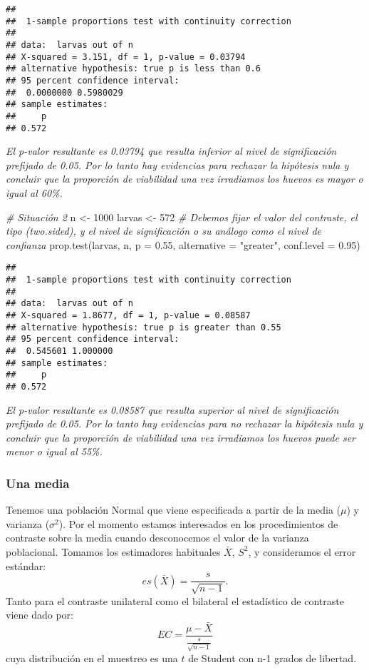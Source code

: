 \documentclass[
]{book}
\newenvironment{Shaded}{\begin{snugshade}}{\end{snugshade}}
\newcommand{\AttributeTok}[1]{\textcolor[rgb]{0.77,0.63,0.00}{#1}}
\newcommand{\CommentTok}[1]{\textcolor[rgb]{0.56,0.35,0.01}{\textit{#1}}}
\newcommand{\DecValTok}[1]{\textcolor[rgb]{0.00,0.00,0.81}{#1}}
\newcommand{\FloatTok}[1]{\textcolor[rgb]{0.00,0.00,0.81}{#1}}
\newcommand{\FunctionTok}[1]{\textcolor[rgb]{0.00,0.00,0.00}{#1}}
\newcommand{\NormalTok}[1]{#1}
\newcommand{\OtherTok}[1]{\textcolor[rgb]{0.56,0.35,0.01}{#1}}
\newcommand{\StringTok}[1]{\textcolor[rgb]{0.31,0.60,0.02}{#1}}
\begin{document}
\begin{verbatim}
## 
##  1-sample proportions test with continuity correction
## 
## data:  larvas out of n
## X-squared = 3.151, df = 1, p-value = 0.03794
## alternative hypothesis: true p is less than 0.6
## 95 percent confidence interval:
##  0.0000000 0.5980029
## sample estimates:
##     p 
## 0.572
\end{verbatim}

\emph{El p-valor resultante es 0.03794 que resulta inferior al nivel de significación prefijado de 0.05. Por lo tanto hay evidencias para rechazar la hipótesis nula y concluir que la proporción de viabilidad una vez irradiamos los huevos es mayor o igual al 60\%.}

\begin{Shaded}
\begin{Highlighting}[]
\CommentTok{\# Situación 2}
\NormalTok{n }\OtherTok{\textless{}{-}} \DecValTok{1000}
\NormalTok{larvas }\OtherTok{\textless{}{-}} \DecValTok{572}
\CommentTok{\# Debemos fijar el valor del contraste, el tipo (two.sided), y el nivel de significación o su análogo como el nivel de confianza}
\FunctionTok{prop.test}\NormalTok{(larvas, n, }\AttributeTok{p =} \FloatTok{0.55}\NormalTok{, }\AttributeTok{alternative =} \StringTok{"greater"}\NormalTok{, }\AttributeTok{conf.level =} \FloatTok{0.95}\NormalTok{)}
\end{Highlighting}
\end{Shaded}

\begin{verbatim}
## 
##  1-sample proportions test with continuity correction
## 
## data:  larvas out of n
## X-squared = 1.8677, df = 1, p-value = 0.08587
## alternative hypothesis: true p is greater than 0.55
## 95 percent confidence interval:
##  0.545601 1.000000
## sample estimates:
##     p 
## 0.572
\end{verbatim}

\emph{El p-valor resultante es 0.08587 que resulta superior al nivel de significación prefijado de 0.05. Por lo tanto hay evidencias para no rechazar la hipótesis nula y concluir que la proporción de viabilidad una vez irradiamos los huevos puede ser menor o igual al 55\%.}

\hypertarget{una-media}{%
\subsubsection{Una media}\label{una-media}}

Tenemos una población Normal que viene especificada a partir de la media (\(\mu\)) y varianza (\(\sigma^2\)). Por el momento estamos interesados en los procedimientos de contraste sobre la media cuando desconocemos el valor de la varianza poblacional. Tomamos los estimadores habituales \(\bar X\), \(S^2\), y consideramos el error estándar: \[es(\bar X) = \frac{s}{\sqrt{n-1}}.\] Tanto para el contraste unilateral como el bilateral el estadístico de contraste viene dado por: \[EC = \frac{\mu - \bar X}{\frac{s}{\sqrt{n-1}}}\] cuya distribución en el muestreo es una \(t\) de Student con n-1 grados de libertad.
\end{document}
